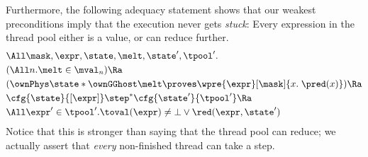 Furthermore, the following adequacy statement shows that our weakest preconditions imply that the execution never gets \emph{stuck}: Every expression in the thread pool either is a value, or can reduce further.
\begin{align*}
 &\All \mask, \expr, \state, \melt, \state', \tpool'.
 \\&(\All n. \melt \in \mval_n) \Ra
 \\&( \ownPhys\state * \ownGGhost\melt \proves \wpre{\expr}[\mask]{x.\; \pred(x)}) \Ra
 \\&\cfg{\state}{[\expr]} \step^\ast
     \cfg{\state'}{\tpool'} \Ra
     \\&\All\expr'\in\tpool'. \toval(\expr) \neq \bot \lor \red(\expr, \state')
\end{align*}
Notice that this is stronger than saying that the thread pool can reduce; we actually assert that \emph{every} non-finished thread can take a step.








